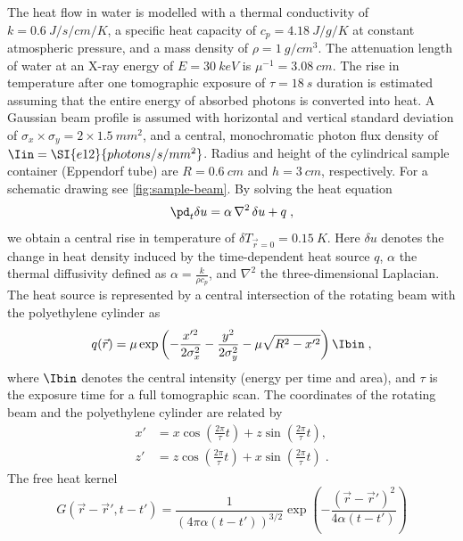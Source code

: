 \documentclass[
twoside,
openright,
titlepage,
numbers=noenddot,
headinclude,
fleqn,
a4paper,
footinclude=true,
cleardoublepage=empty,
abstractoff,
BCOR=5mm,
paper=a4,
fontsize=11pt,
british,ngerman,american,
]{scrreprt}
\begin{document}
The heat flow in water is modelled with a thermal conductivity of
$k=\SI{0.6}{J/s/cm/K}$, a specific heat capacity of
$c_p=\SI{4.18}{J/g/K}$ at constant atmospheric pressure, and a mass
density of $\rho=\SI{1}{g/cm^3}$.  The attenuation length of water at
an X-ray energy of $E=\SI{30}{keV}$ is $\mu^{-1}=\SI{3.08}{cm}$.  The
rise in temperature after one tomographic exposure of
$\tau=\SI{18}{s}$ duration is estimated assuming that the entire
energy of absorbed photons is converted into heat.  A Gaussian beam
profile is assumed with horizontal and vertical standard deviation of
$\sigma_x \times \sigma_y = \num{2}\times\SI{1.5}{mm^2}$, and a
central, monochromatic photon flux density of
$\Iin=\SI{e12}{photons/s/mm^2}$.  Radius and height of the cylindrical
sample container (Eppendorf tube) are $R=\SI{0.6}{cm}$ and
$h=\SI{3}{cm}$, respectively.  For a schematic drawing see
\cref{fig:sample-beam}.  By solving the heat equation
\begin{equation}
  \label{eq:heat-eq}
  \pd_t \delta u = \alpha\, \nabla^2\,\delta u + q\;, 
\end{equation}
we obtain a central rise in temperature of $\delta
T_{\vec{r}=0}=\SI{0.15}{K}$.  Here $\delta u$ denotes the change in
heat density induced by the time-dependent heat source $q$, $\alpha$
the thermal diffusivity defined as $\alpha = \frac{k}{\rho c_p}$, and
$\nabla^2$ the three-dimensional Laplacian.  The heat source is
represented by a central intersection of the rotating beam with the
polyethylene cylinder as
\begin{equation}
  q(\vec{r})=
  \mu\exp\left(-\frac{x'^2}{2\sigma_x^2} -\frac{y^2}{2\sigma_y^2} 
    -\mu\sqrt{R^2-x'^2}\right)\Ibin\;, 
\end{equation}
where $\Ibin$ denotes the central intensity (energy per time and
area), and $\tau$ is the exposure time for a full tomographic scan.
The coordinates of the rotating beam and the polyethylene cylinder are
related by
\begin{equation}
  \label{eq:beam-cylinder}
  \begin{split}
      x' & = x\cos\left(\frac{2\pi}{\tau}t\right)
      +z\sin\left(\frac{2\pi}{\tau}t\right),
      \\ z' & = z\cos\left(\frac{2\pi}{\tau}t\right)
      +x\sin\left(\frac{2\pi}{\tau}t\right) \;.
  \end{split}
\end{equation}
The free heat kernel
\begin{equation}
  \label{eq:heat-kernel}
  G(\vec{r}-\vec{r}',t-t')=
  \frac{1}{\left(4\pi\alpha(t-t')\right)^{3/2}}
  \exp\left(- \frac{ (\vec{r}-\vec{r}')^2 }{ 4\alpha(t-t')} \right)
\end{equation}
\end{document}
